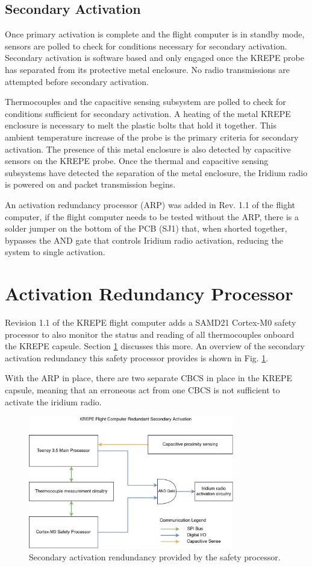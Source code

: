 \documentclass{article}
\begin{document}
\subsection{Secondary Activation}
Once primary activation is complete and the flight computer is in standby mode, sensors are polled to check for conditions necessary for secondary activation. Secondary activation is software based and only engaged once the KREPE probe has separated from its protective metal enclosure. No radio transmissions are attempted before secondary activation. 

Thermocouples and the capacitive sensing subsystem are polled to check for conditions sufficient for secondary activation. A heating of the metal KREPE enclosure is necessary to melt the plastic bolts that hold it together. This ambient temperature increase of the probe is the primary criteria for secondary activation. The presence of this metal enclosure is also detected by capacitive sensors on the KREPE probe. Once the thermal and capacitive sensing subsystems have detected the separation of the metal enclosure, the Iridium radio is powered on and packet transmission begins.  

An activation redundancy processor (ARP) was added in Rev. 1.1 of the flight computer, if the flight computer needs to be tested without the ARP, there is a solder jumper on the bottom of the PCB (SJ1) that, when shorted together, bypasses the AND gate that controls Iridium radio activation, reducing the system to single activation.

\section{Activation Redundancy Processor}
\label{actred}
Revision 1.1 of the KREPE flight computer adds a SAMD21 Cortex-M0 safety processor to also monitor the status and reading of all thermocouples onboard the KREPE capsule. Section \ref{actred} discusses this more. An overview of the secondary activation redundancy this safety processor provides is shown in Fig. \ref{fig:actred}.

With the ARP in place, there are two separate CBCS in place in the KREPE capsule, meaning that an erroneous act from one CBCS is not sufficient to activate the iridium radio. 

\begin{figure}
  \centering
  \includegraphics[width=0.8\textwidth]{images/redundant-activation.png}
  \caption{Secondary activation rendundancy provided by the safety processor.}
  \label{fig:actred}
\end{figure}
\end{document}
